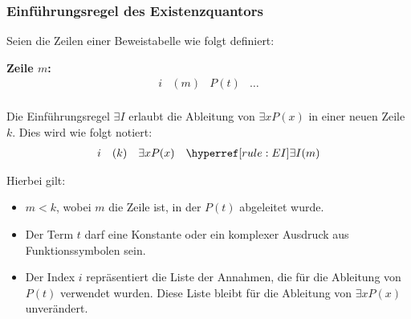 \documentclass[main.tex]{subfiles}
\begin{document}
\subsubsection{Einführungsregel des Existenzquantors}
\label{rule:EI}
\begin{definition}
Seien die Zeilen einer Beweistabelle wie folgt definiert:

\textbf{Zeile \(m\):}
\[
\begin{array}{llll}
    i & (m) & P(t) & \dots \\
\end{array}
\]

Die Einführungsregel \(\exists I\) erlaubt die Ableitung von \(\exists x P(x)\) in einer neuen Zeile \(k\). Dies wird wie folgt notiert:
\[
\begin{array}{llll}
    i & (k) & \exists x P(x) & \rEI{m} \\
\end{array}
\]

Hierbei gilt:
\begin{itemize}
    \item \(m < k\), wobei \(m\) die Zeile ist, in der \(P(t)\) abgeleitet wurde.
    \item Der Term \(t\) darf eine Konstante oder ein komplexer Ausdruck aus Funktionssymbolen sein.
    \item Der Index \(i\) repräsentiert die Liste der Annahmen, die für die Ableitung von \(P(t)\) verwendet wurden. Diese Liste bleibt für die Ableitung von \(\exists x P(x)\) unverändert.
\end{itemize}
\end{definition}
\end{document}
